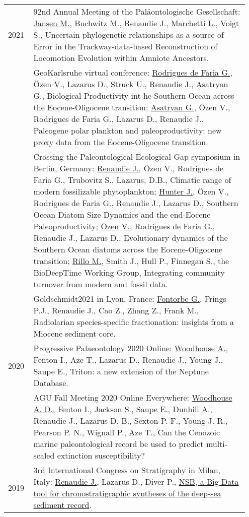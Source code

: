\documentclass[11pt, a4paper]{article}
\begin{document}
\begin{longtable}{@{}p{0.1\linewidth} P{0.85\linewidth}@{}}
2021 & 92nd Annual Meeting of the Pal\"{a}ontologische Gesellschaft: \underline{Jansen M.}, Buchwitz M., Renaudie J., Marchetti L., Voigt S., Uncertain phylogenetic relationships as a source of Error in the Trackway-data-based Reconstruction of Locomotion Evolution within Amniote Ancestors.\\
 & GeoKarlsruhe virtual conference: \underline{Rodrigues de Faria G.}, Özen V., Lazarus D., Struck U., Renaudie J., Asatryan G., Biological Productivity int he Southern Ocean across the Eocene-Oligocene transition; \underline{Asatryan G.}, Özen V., Rodrigues de Faria G., Lazarus D., Renaudie J., Paleogene polar plankton and paleoproductivity: new proxy data from the Eocene-Oligocene transition.\\
 & Crossing the Paleontological-Ecological Gap symposium in Berlin, Germany: \underline{Renaudie J.}, Özen V., Rodrigues de Faria G., Trubovitz S., Lazarus, D.B., Climatic range of modern fossilizable phytoplankton; \underline{Hunter J.}, Özen V., Rodrigues de Faria G., Renaudie J., Lazarus D., Southern Ocean Diatom Size Dynamics and the end-Eocene Paleoproductivity; \underline{Özen V.}, Rodrigues de Faria G., Renaudie J., Lazarus D., Evolutionary dynamics of the Southern Ocean diatoms across the Eocene-Oligocene transition; \underline{Rillo M.}, Smith J., Hull P., Finnegan S., the BioDeepTime Working Group, Integrating community turnover from modern and fossil data.\\
& Goldschmidt2021 in Lyon, France: \underline{Fontorbe G.}, Frings P.J., Renaudie J., Cao Z., Zhang Z., Frank M., Radiolarian species-specific fractionation: insights from a Miocene sediment core.\\
2020 & Progressive Palaeontology 2020 Online: \underline{Woodhouse A.}, Fenton I., Aze T., Lazarus D., Renaudie J., Young J., Saupe E., Triton: a new extension of the Neptune Database.\\
 & AGU Fall Meeting 2020 Online Everywhere: \underline{Woodhouse A. D.}, Fenton I., Jackson S., Saupe E., Dunhill A., Renaudie J., Lazarus D. B., Sexton P. F., Young J. R., Pearson P. N., Wignall P., Aze T., Can the Cenozoic marine paleontological record be used to predict multi-scaled extinction susceptibility? \\
2019 & 3rd International Congress on Stratigraphy in Milan, Italy: \underline{Renaudie J.}, Lazarus D., Diver P., \href{http://plannapus.github.io/data/20190723Potsdam.pdf}{NSB, a Big Data tool for chronostratigraphic syntheses of the deep-sea sediment record}.\\

\end{longtable}
\end{document}
